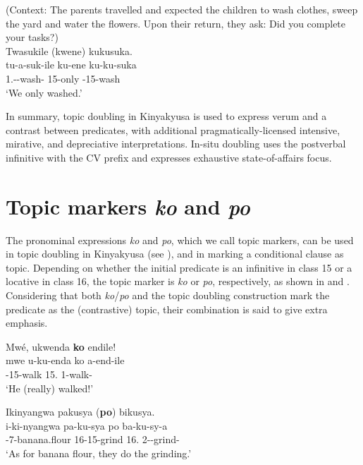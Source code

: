 \documentclass[output=paper]{langscibook}
\begin{document}
\z


\ea
\label{bkm:Ref123830829}
(Context: The parents travelled and expected the children to wash clothes, sweep the yard and water the flowers. Upon their return, they ask: Did you complete your tasks?)\\
Twasukile (kwene) kukusuka.\\
\gll
tu-a-suk-ile  ku-ene  ku-ku-suka\\
1\PL.\SM{}-\PST{}-wash-\PFV{}  15-only  \EXH{}-15-wash\\
\glt
‘We only washed.’\\

\z


In summary, topic doubling in Kinyakyusa is used to express verum and a contrast between predicates, with additional pragmatically-licensed intensive, mirative, and depreciative interpretations. In-situ doubling uses the postverbal infinitive with the CV prefix and expresses exhaustive state-of-affairs focus.

\section{Topic markers \textit{ko} and \textit{po}}
\label{bkm:Ref123889293}
The pronominal expressions \textit{ko} and \textit{po}, which we call topic markers, can be used in topic doubling in Kinyakyusa (see ), and in marking a conditional clause as topic. Depending on whether the initial predicate is an infinitive in class 15 or a locative in class 16, the topic marker is \textit{ko} or \textit{po}, respectively, as shown in  and . Considering that both \textit{ko}/\textit{po} and the topic doubling construction mark the predicate as the (contrastive) topic, their combination is said to give extra emphasis.

\ea
\label{bkm:Ref122429137}
Mwé, ukwenda \textbf{ko} endile!\\
\gll
mwe  u-ku-enda  ko  a-end-ile\\
\EXCLAM{}  \AUG{}-15-walk  15.\PRO{}  1\SM{}-walk-\PFV{}\\
\glt
‘He (really) walked!’\\

\z


\ea
\label{bkm:Ref122429135}
Ikinyangwa pakusya (\textbf{po}) bikusya.\\
\gll
i-ki-nyangwa  pa-ku-sya  po  ba-ku-sy-a\\
\AUG{}-7-banana.flour  16-15-grind  16.\PRO{}  2\SM{}-\PRS{}-grind-\FV{}\\
\glt
‘As for banana flour, they do the grinding.’\\
\end{document}
